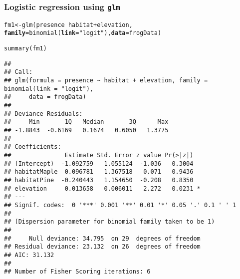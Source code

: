 \documentclass[color=usenames,dvipsnames]{beamer}\usepackage[]{graphicx}\usepackage[]{color}
\makeatletter
\newcommand{\hlstr}[1]{\textcolor[rgb]{0.749,0.012,0.012}{#1}}%
\newcommand{\hlopt}[1]{\textcolor[rgb]{0,0,0}{#1}}%
\newcommand{\hlstd}[1]{\textcolor[rgb]{0,0,0}{#1}}%
\newcommand{\hlkwb}[1]{\textcolor[rgb]{0,0.341,0.682}{#1}}%
\newcommand{\hlkwc}[1]{\textcolor[rgb]{0,0,0}{\textbf{#1}}}%
\newcommand{\hlkwd}[1]{\textcolor[rgb]{0.004,0.004,0.506}{#1}}%
\newenvironment{kframe}{%
 \def\at@end@of@kframe{}%
 \ifinner\ifhmode%
  \def\at@end@of@kframe{\end{minipage}}%
  \begin{minipage}{\columnwidth}%
 \fi\fi%
 \def\FrameCommand##1{\hskip\@totalleftmargin \hskip-\fboxsep
 \colorbox{shadecolor}{##1}\hskip-\fboxsep
     \hskip-\linewidth \hskip-\@totalleftmargin \hskip\columnwidth}%
 \MakeFramed {\advance\hsize-\width
   \@totalleftmargin\z@ \linewidth\hsize
   \@setminipage}}%
 {\par\unskip\endMakeFramed%
 \at@end@of@kframe}
\newenvironment{knitrout}{}{} %
\makeatother
\begin{document}
\begin{frame}[fragile]
  \frametitle{Logistic regression using {\tt glm}}
  \footnotesize
\begin{knitrout}\footnotesize
{}\color{fgcolor}\begin{kframe}
\begin{alltt}
\hlstd{fm1} \hlkwb{<-} \hlkwd{glm}\hlstd{(presence} \hlopt{~} \hlstd{habitat} \hlopt{+} \hlstd{elevation,}
           \hlkwc{family}\hlstd{=}\hlkwd{binomial}\hlstd{(}\hlkwc{link}\hlstd{=}\hlstr{"logit"}\hlstd{),} \hlkwc{data}\hlstd{=frogData)}
\end{alltt}
\end{kframe}
\end{knitrout}
\pause
\tiny
\begin{knitrout}\tiny
{}\color{fgcolor}\begin{kframe}
\begin{alltt}
\hlkwd{summary}\hlstd{(fm1)}
\end{alltt}
\begin{verbatim}
## 
## Call:
## glm(formula = presence ~ habitat + elevation, family = binomial(link = "logit"), 
##     data = frogData)
## 
## Deviance Residuals: 
##     Min       1Q   Median       3Q      Max  
## -1.8843  -0.6169   0.1674   0.6050   1.3775  
## 
## Coefficients:
##               Estimate Std. Error z value Pr(>|z|)  
## (Intercept)  -1.092759   1.055124  -1.036   0.3004  
## habitatMaple  0.096781   1.367518   0.071   0.9436  
## habitatPine  -0.240443   1.154650  -0.208   0.8350  
## elevation     0.013658   0.006011   2.272   0.0231 *
## ---
## Signif. codes:  0 '***' 0.001 '**' 0.01 '*' 0.05 '.' 0.1 ' ' 1
## 
## (Dispersion parameter for binomial family taken to be 1)
## 
##     Null deviance: 34.795  on 29  degrees of freedom
## Residual deviance: 23.132  on 26  degrees of freedom
## AIC: 31.132
## 
## Number of Fisher Scoring iterations: 6
\end{verbatim}
\end{kframe}
\end{knitrout}
\end{frame}


\end{document}
